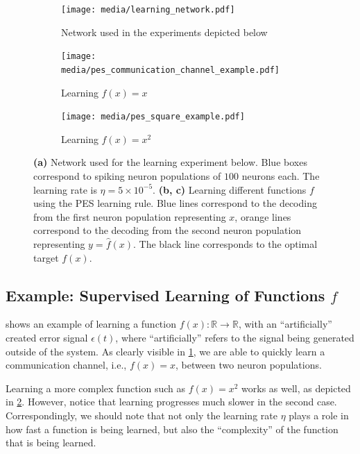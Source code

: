 \documentclass[10pt,letterpaper,oneside]{article}
\begin{document}
\begin{figure}[p]
	\centering
	\begin{subfigure}{\textwidth}
		\centering
		\texttt{[image: media/learning\_network.pdf]}
		\caption{Network used in the experiments depicted below}
	\end{subfigure}
	\begin{subfigure}{\textwidth}
		\centering
		\texttt{[image: media/pes\_communication\_channel\_example.pdf]}
		\caption{Learning $f(x) = x$}
		\label{fig:pes_communication_channel_example}
	\end{subfigure}
	\begin{subfigure}{\textwidth}
		\centering
		\texttt{[image: media/pes\_square\_example.pdf]}
		\caption{Learning $f(x) = x^2$}
		\label{fig:pes_square_example}
	\end{subfigure}
	\caption{\textbf{(a)} Network used for the learning experiment below. Blue boxes correspond to spiking neuron populations of $100$ neurons each. The learning rate is $\eta = 5 \times 10^{-5}$. \textbf{(b, c)} Learning different functions $f$ using the PES learning rule. Blue lines correspond to the decoding from the first neuron population representing $x$, orange lines correspond to the decoding from the second neuron population representing $y = \hat f(x)$. The black line corresponds to the optimal target $f(x)$. }
	\label{fig:pes_learning_network}
\end{figure}

\subsection{Example: Supervised Learning of Functions $f$}

 shows an example of learning a function $f(x) : \mathbb{R} \longrightarrow \mathbb{R}$, with an \enquote{artificially} created error signal $\epsilon(t)$, where \enquote{artificially} refers to the signal being generated outside of the system. As clearly visible in \cref{fig:pes_communication_channel_example}, we are able to quickly learn a communication channel, i.e., $f(x) = x$, between two neuron populations.

Learning a more complex function such as $f(x) = x^2$ works as well, as depicted in \cref{fig:pes_square_example}. However, notice that learning progresses much slower in the second case. Correspondingly, we should note that not only the learning rate $\eta$ plays a role in how fast a function is being learned, but also the \enquote{complexity} of the function that is being learned.
\end{document}
